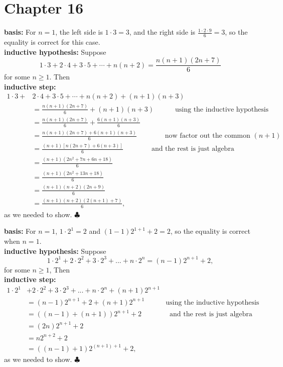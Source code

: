     \section*{Chapter 16}
\begin{Solution}{16.1}
{\bfseries basis:} For $n=1$, the left side is $1\cdot 3 = 3$, and the right side is
$\frac{1\cdot2\cdot9}{6} =3$, so the equality is correct for this case. \\
{\bfseries inductive hypothesis:} Suppose 
\[1\cdot3 + 2\cdot4 + 3\cdot 5 + \cdots + n(n+2) = \frac{n(n+1)(2n+7)}{6}\]
for some $n\geq 1$. Then\\
{\bfseries inductive step:} 
\begin{align*}
1\cdot3 +& 2\cdot4 + 3\cdot 5 + \cdots + n(n+2) + (n+1)(n+3) \\
&= \frac{n(n+1)(2n+7)}{6} + (n+1)(n+3) \qquad\quad\text{using the inductive hypothesis}\\
&= \frac{n(n+1)(2n+7)}{6} + \frac{6(n+1)(n+3)}{6} \\
&= \frac{n(n+1)(2n+7)+ 6(n+1)(n+3)}{6}\qquad\qquad\text{now factor out the common } (n+1)\\
&= \frac{(n+1)[n(2n+7)+ 6(n+3)]}{6}\qquad\qquad \text{and the rest is just algebra}\\
&= \frac{(n+1)(2n^2+7n+ 6n+18)}{6}\\
&= \frac{(n+1)(2n^2+13n+18)}{6}\\
&= \frac{(n+1)(n+2)(2n+9)}{6}\\
&= \frac{(n+1)(n+2)(2(n+1)+7)}{6},
\end{align*}
as we needed to show. $\clubsuit$
\end{Solution}

\begin{Solution}{16.2}
{\bfseries basis:} For $n=1$, $1\cdot 2^1= 2$ and $(1-1)2^{1+1} +2 = 2$, so the equality is correct when $n=1$.\\
 {\bfseries inductive hypothesis:} Suppose 
 \[
 1\cdot 2^1+2\cdot 2^2+3\cdot 2^3+...+n\cdot 2^n=(n-1)2^{n+1}+2, 
\]
for some $n\geq 1$, Then\\
{\bfseries inductive step:} 
\begin{align*}
1\cdot 2^1&+2\cdot 2^2+3\cdot 2^3+...+n\cdot 2^n + (n+1)2^{n+1}\\
&= (n-1)2^{n+1}+2 +(n+1)2^{n+1} \qquad\quad\text{using the inductive hypothesis}\\
&= ((n-1)+(n+1))2^{n+1} + 2 \qquad\qquad \text{and the rest is just algebra}\\
&= (2n)2^{n+1} + 2\\
&= n2^{n+2} + 2\\
&= ((n-1)+1)2^{(n+1)+1} + 2,
\end{align*}
as we needed to show. $\clubsuit$
\end{Solution}

